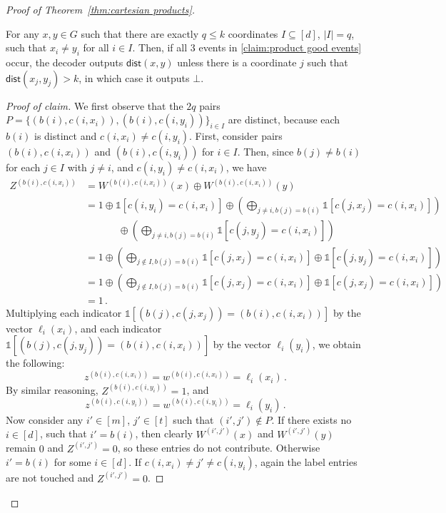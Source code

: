 \documentclass{theoretics}
\newcommand{\dist}{\mathsf{dist}}
\newcommand{\ind}[1]{\mathds{1} \left[ #1 \right] }
\begin{document}
\begin{proof}[Proof of Theorem~\ref{thm:cartesian products}]
\begin{claim}
For any $x,y \in G$ such that there are exactly $q \leq k$ coordinates $I \subseteq [d]$, $|I|
= q$, such that $x_i \neq y_i$ for all $i \in I$. Then, if all 3 events in \cref{claim:product
good events} occur, the decoder outputs $\dist(x,y)$ unless there is a coordinate $j$ such that
$\dist(x_j,y_j) > k$, in which case it outputs $\bot$.
\end{claim}
\begin{proof}[Proof of claim]
We first observe that the $2q$ pairs $P = \{(b(i), c(i,x_i)), (b(i), c(i,y_i)) \}_{i \in I}$ are
distinct, because each $b(i)$ is distinct and $c(i,x_i) \neq c(i,y_i)$. First, consider pairs $(b(i), c(i,x_i))$ and $(b(i), c(i,y_i))$ for $i\in I$. Then, since $b(j) \neq b(i)$ for each $j \in I$ with $j \neq i$, and
$c(i,y_i) \neq c(i,x_i)$, we have
\begin{align*}
  Z^{(b(i), c(i,x_i))} &= W^{(b(i), c(i,x_i))}(x) \oplus W^{(b(i), c(i,x_i))}(y) \\
    &= 1 \oplus \ind{c(i,y_i)=c(i,x_i)}
    \oplus \left(\bigoplus_{j \neq i, b(j) = b(i)} \ind{ c(j,x_j) = c(i,x_i) } \right)
\\	&\phantom{{}={}}\qquad
    \oplus \left(\bigoplus_{j \neq i, b(j) = b(i)} \ind{ c(j,y_j) = c(i,x_i) } \right) \\
    &= 1 \oplus \left(\bigoplus_{j \notin I, b(j) = b(i)} \ind{ c(j,x_j) = c(i,x_i) } 
                                                   \oplus \ind{ c(j,y_j) = c(i,x_i) } \right) \\
    &= 1 \oplus \left(\bigoplus_{j \notin I, b(j) = b(i)} \ind{ c(j,x_j) = c(i,x_i) } 
                                                   \oplus \ind{ c(j,x_j) = c(i,x_i) } \right) \\
    &= 1 \,.
\end{align*}
Multiplying each indicator $\ind{(b(j),c(j,x_j)) =
(b(i),c(i,x_i))}$ by the vector $\ell_i(x_i)$, and each indicator $\ind{(b(j),c(j,y_j)) =
(b(i),c(i,x_i))}$ by the vector $\ell_i(y_i)$, we obtain the following:
\[
  z^{(b(i), c(i,x_i))} = w^{(b(i),c(i,x_i))} = \ell_i(x_i) \,.
\]
By similar reasoning, $Z^{(b(i), c(i,y_i))} = 1$, and
\[
  z^{(b(i), c(i,y_i))} = w^{(b(i),c(i,y_i))} = \ell_i(y_i) \,.
\]
Now consider any $i'\in[m]$, $j'\in[t]$ such that $(i',j')\notin P$.
If there exists no $i\in[d]$, such that $i' = b(i)$, then
clearly $W^{(i',j')}(x)$ and $W^{(i',j')}(y)$ remain $0$ and $Z^{(i',j')}=0$, so these entries
do not contribute.
Otherwise $i' = b(i)$ for some $i\in[d]$. 
If $c(i,x_i) \ne j' \ne c(i,y_i)$, again the label entries are not touched and $Z^{(i',j')}=0$.

\end{proof}
\end{proof}
\end{document}
